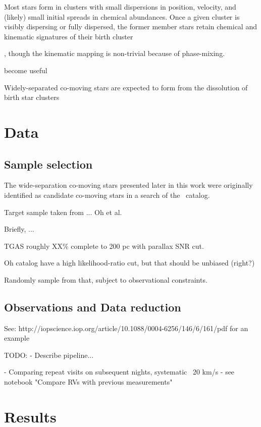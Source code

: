 \documentclass[modern, letterpaper]{aastex61}
\newcommand{\tgas}{\acronym{TGAS}}
\begin{document}
Most stars form in clusters with small dispersions in position, velocity, and
(likely) small initial spreads in chemical abundances.
Once a given cluster is visibly dispersing or fully dispersed, the former member
stars retain chemical and kinematic signatures of their birth cluster

, though
the kinematic mapping is non-trivial because of phase-mixing.

become
useful

Widely-separated co-moving stars are expected to form from the dissolution of
birth star clusters


\section{Data}\label{sec:data}

\subsection{Sample selection}\label{sec:sample}

The wide-separation co-moving stars presented later in this work were originally
identified as candidate co-moving stars in a search of the \tgas\ catalog.

Target sample taken from ... Oh et al.

Briefly, ...

TGAS roughly XX\% complete to 200 pc with parallax SNR cut.

Oh catalog have a high likelihood-ratio cut, but that should be unbiased (right?)

Randomly sample from that, subject to observational constraints.

\subsection{Observations and Data reduction}\label{sec:reduction}

See: http://iopscience.iop.org/article/10.1088/0004-6256/146/6/161/pdf for an example

TODO:
- Describe pipeline...

- Comparing repeat visits on subsequent nights, systematic ~20 km/s
    - see notebook "Compare RVs with previous measurements"

\section{Results}
\end{document}

